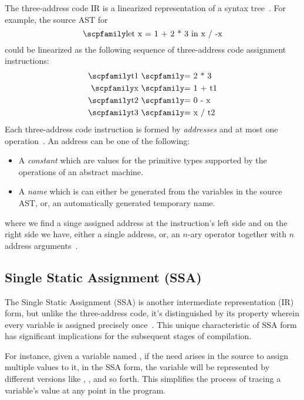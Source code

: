 \documentclass[
  oneside,
  english,
  coorientadorbanca,
  noabntexcite
]{ufsc-thesis-rn46-2019}
\newcommand{\code}[1]{\text{\scpfamily\setlength\spaceskip{0.35em}#1}}
\begin{document}
The three-address code IR is a linearized representation of a syntax tree~\cite{Aho:2006:CPT:1177220}.
For example, the source AST for
\begin{equation*}
  \code{let x = 1 + 2 * 3 in x / -x}
\end{equation*}
could be linearized as the following sequence of three-address code assignment instructions:
\begin{align*}
  \code{t1} \  & \code{= 2 * 3}  \\
  \code{x}  \  & \code{= 1 + t1} \\
  \code{t2} \  & \code{= 0 - x}  \\
  \code{t3} \  & \code{= x / t2}
\end{align*}
Each three-address code instruction is formed by \textit{addresses} and at most one operation~\cite{Aho:2006:CPT:1177220}.
An address can be one of the following:
\begin{itemize}
  \item A \textit{constant} \code{c} which are values for the primitive types supported by the operations of an abstract machine.

  \item A \textit{name} \code{n} which is can either be generated from the variables in the source AST, or, an automatically generated temporary name.
\end{itemize}

where we find a singe assigned address at the instruction's left side and on the right side we have, either a single address, or, an $n$-ary operator together with $n$ address arguments~\cite{Aho:2006:CPT:1177220}.

\subsection{Single Static Assignment (SSA)}

The Single Static Assignment (SSA) is another intermediate representation (IR) form, but unlike the three-address code, it's distinguished by its property wherein every variable is assigned precisely once~\cite{Cytron:1991:ESA:115372.115320}. This unique characteristic of SSA form has significant implications for the subsequent stages of compilation.

For instance, given a variable named \code{x}, if the need arises in the source to assign multiple values to it, in the SSA form, the variable will be represented by different versions like \code{x1}, \code{x2}, and so forth. This simplifies the process of tracing a variable's value at any point in the program.
\end{document}
